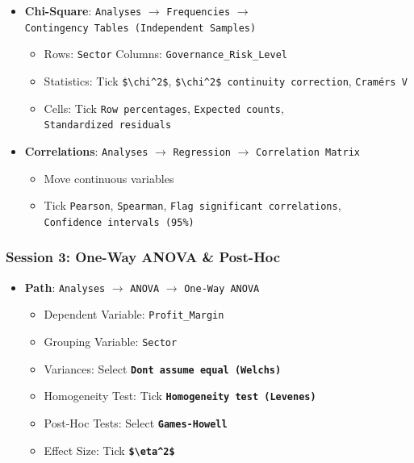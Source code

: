 \documentclass[
]{article}
\providecommand{\tightlist}{%
  \setlength{\itemsep}{0pt}\setlength{\parskip}{0pt}}
\begin{document}
\begin{itemize}
\tightlist
\item
  \textbf{Chi-Square}: \texttt{Analyses} \(\rightarrow\)
  \texttt{Frequencies} \(\rightarrow\)
  \texttt{Contingency\ Tables\ (Independent\ Samples)}

  \begin{itemize}
  \tightlist
  \item
    Rows: \texttt{Sector} \textbar{} Columns:
    \texttt{Governance\_Risk\_Level}
  \item
    Statistics: Tick \texttt{\$\textbackslash{}chi\^{}2\$},
    \texttt{\$\textbackslash{}chi\^{}2\$\ continuity\ correction},
    \texttt{Cramér\textquotesingle{}s\ V}
  \item
    Cells: Tick \texttt{Row\ percentages}, \texttt{Expected\ counts},
    \texttt{Standardized\ residuals}
  \end{itemize}
\item
  \textbf{Correlations}: \texttt{Analyses} \(\rightarrow\)
  \texttt{Regression} \(\rightarrow\) \texttt{Correlation\ Matrix}

  \begin{itemize}
  \tightlist
  \item
    Move continuous variables
  \item
    Tick \texttt{Pearson}, \texttt{Spearman},
    \texttt{Flag\ significant\ correlations},
    \texttt{Confidence\ intervals\ (95\%)}
  \end{itemize}
\end{itemize}

\subsubsection{Session 3: One-Way ANOVA \&
Post-Hoc}\label{session-3-one-way-anova-post-hoc}

\begin{itemize}
\tightlist
\item
  \textbf{Path}: \texttt{Analyses} \(\rightarrow\) \texttt{ANOVA}
  \(\rightarrow\) \texttt{One-Way\ ANOVA}

  \begin{itemize}
  \tightlist
  \item
    Dependent Variable: \texttt{Profit\_Margin}
  \item
    Grouping Variable: \texttt{Sector}
  \item
    Variances: Select
    \textbf{\texttt{Don\textquotesingle{}t\ assume\ equal\ (Welch\textquotesingle{}s)}}
  \item
    Homogeneity Test: Tick
    \textbf{\texttt{Homogeneity\ test\ (Levene\textquotesingle{}s)}}
  \item
    Post-Hoc Tests: Select \textbf{\texttt{Games-Howell}}
  \item
    Effect Size: Tick \textbf{\texttt{\$\textbackslash{}eta\^{}2\$}}
  \end{itemize}
\end{itemize}
\end{document}
